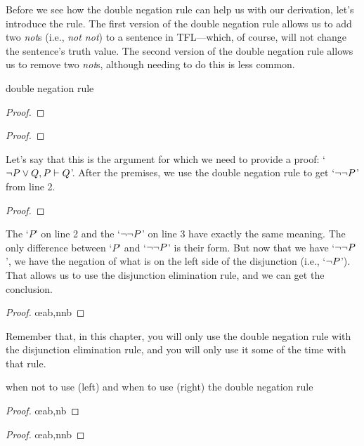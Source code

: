 Before we see how the double negation rule can help us with our derivation, let's introduce the rule. The first version of the double negation rule allows us to add two \textit{not}s (i.e., \textit{not not}) to a sentence in TFL---which, of course, will not change the sentence's truth value. The second version of the double negation rule allows us to remove two \textit{not}s, although needing to do this is less common. 

\begin{factboxy-width}[width=7.5cm]{double negation rule}
\begin{proof}
	 
\end{proof}

\begin{proof}
	 
\end{proof}
\end{factboxy-width}

Let's say that this is the argument for which we need to provide a proof: `${\neg} P \vee Q, P \vdash Q$'. After the premises, we use the double negation rule to get `${\neg} {\neg} P$' from line 2.

\begin{proof}
	 \pr{}
	 \pr{} 
	 
\end{proof}
The `$P$' on line 2 and the `${\neg} {\neg} P$' on line 3 have exactly the same meaning. The only difference between `$P$' and `${\neg} {\neg} P$' is their form. But now that we have `${\neg} {\neg} P$', we have the negation of what is on the left side of the disjunction (i.e., `${\neg} P$'). That allows us to use the disjunction elimination rule, and we can get the conclusion.

\begin{proof}
	 \pr{}
	 \pr{}
	 
	 \oe{ab,nnb}
\end{proof}

Remember that, in this chapter, you will only use the double negation rule with the disjunction elimination rule, and you will only use it some of the time with that rule.

\begin{factboxy-side}{when not to use (left) and when to use (right) the double negation rule}
\begin{proof}
	 \oe{ab,nb}
\end{proof}
\tcblower
\begin{proof}
	 
	 \oe{ab,nnb}
\end{proof}
\end{factboxy-side}


